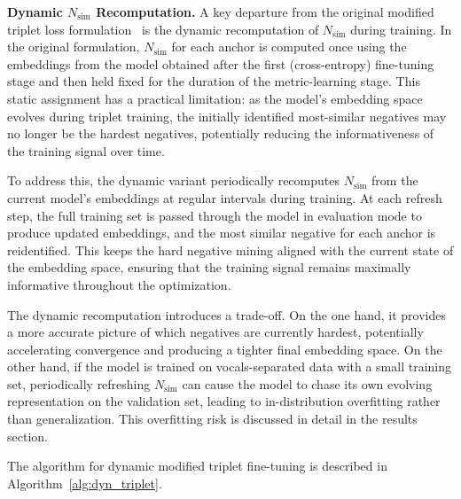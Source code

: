 \documentclass[conference]{IEEEtran}
\begin{document}
\textbf{Dynamic $N_{\text{sim}}$ Recomputation.} A key departure from the original modified triplet loss formulation~\cite{ismir_paper} is the dynamic recomputation of $N_{\text{sim}}$ during training. In the original formulation, $N_{\text{sim}}$ for each anchor is computed once using the embeddings from the model obtained after the first (cross-entropy) fine-tuning stage and then held fixed for the duration of the metric-learning stage. This static assignment has a practical limitation: as the model's embedding space evolves during triplet training, the initially identified most-similar negatives may no longer be the hardest negatives, potentially reducing the informativeness of the training signal over time.

To address this, the dynamic variant periodically recomputes $N_{\text{sim}}$ from the current model's embeddings at regular intervals during training. At each refresh step, the full training set is passed through the model in evaluation mode to produce updated embeddings, and the most similar negative for each anchor is reidentified. This keeps the hard negative mining aligned with the current state of the embedding space, ensuring that the training signal remains maximally informative throughout the optimization.

The dynamic recomputation introduces a trade-off. On the one hand, it provides a more accurate picture of which negatives are currently hardest, potentially accelerating convergence and producing a tighter final embedding space. On the other hand, if the model is trained on vocals-separated data with a small training set, periodically refreshing $N_{\text{sim}}$ can cause the model to chase its own evolving representation on the validation set, leading to in-distribution overfitting rather than generalization. This overfitting risk is discussed in detail in the results section.

The algorithm for dynamic modified triplet fine-tuning is described in Algorithm~\ref{alg:dyn_triplet}.
\end{document}
